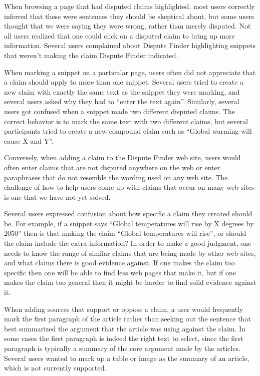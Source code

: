 \documentclass{www2010-submission}
\begin{document}
When browsing a page that had disputed claims highlighted, most users correctly inferred that these were sentences they should be skeptical about, but some users thought that we were saying they were wrong, rather than merely disputed. Not all users realized that one could click on a disputed claim to bring up more information. Several users complained about Dispute Finder highlighting snippets that weren't making the claim Dispute Finder indicated.

%

When marking a snippet on a particular page, users often did not appreciate that a claim should apply to more than one snippet. Several users tried to create a new claim with exactly the same text as the snippet they were marking, and several users asked why they had to ``enter the text again''. Similarly, several users got confused when a snippet made two different disputed claims. The correct behavior is to mark the same text with two different claims, but several participants tried to create a new compound claim such as ``Global warming will cause X and Y''. 

Conversely, when adding a claim to the Dispute Finder web site, users would often enter claims that are not disputed anywhere on the web or enter paraphrases that do not resemble the wording used on any web site. The challenge of how to help users come up with claims that occur on many web sites is one that we have not yet solved.

Several users expressed confusion about how specific a claim they created should be. For example, if a snippet says ``Global temperatures will rise by X degrees by 2050'' then is that making the claim ``Global temperatures will rise'', or should the claim include the extra information? In order to make a good judgment, one needs to know the range of similar claims that are being made by other web sites, and what claims there is good evidence against. If one makes the claim too specific then one will be able to find less web pages that make it, but if one makes the claim too general then it might be harder to find solid evidence against it.

When adding sources that support or oppose a claim, a user would frequently mark the first paragraph of the article rather than seeking out the sentence that best summarized the argument that the article was using against the claim. In some cases the first paragraph is indeed the right text to select, since the first paragraph is typically a summary of the core argument made by the articles. Several users wanted to mark up a table or image as the summary of an article, which is not currently supported.
\end{document}
